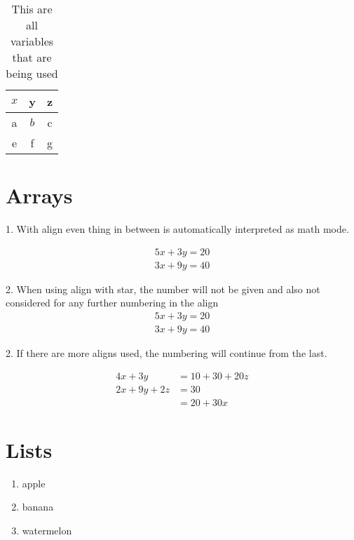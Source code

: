 \documentclass{article}
\begin{document}
\begin{center} %
\begin{table}[H] %
\def \arraystretch{1.5}
\centering %
\begin{tabular}{||c|cc||}

    \hline \hline
     $x$ &  y & z \\ \hline
     a & $b$ & c \\ \hline 
    e & f & g \\
     \hline \hline
     
\end{tabular}
\caption{This are all variables that are being used}
\end{table}
\end{center}

\section{Arrays}

1. With align even thing in between is automatically interpreted as math mode.

\begin{align}
    5x+3y = 20\\
    3x+9y = 40
\end{align}

2. When using align with star, the number will not be given and also not considered for any further numbering in the align
\begin{align*} 
    5x+3y = 20\\
    3x+9y = 40
\end{align*}

2. If there are more aligns used, the numbering will continue from the last.

\begin{align}
    4x+3y &= 10+30+20z\\
    2x+9y+2z &= 30\\     %
    &=20+30x
\end{align}

\section{Lists}

\begin{enumerate}
    \item apple
    \item banana
    \item watermelon
\end{enumerate}
\end{document}
